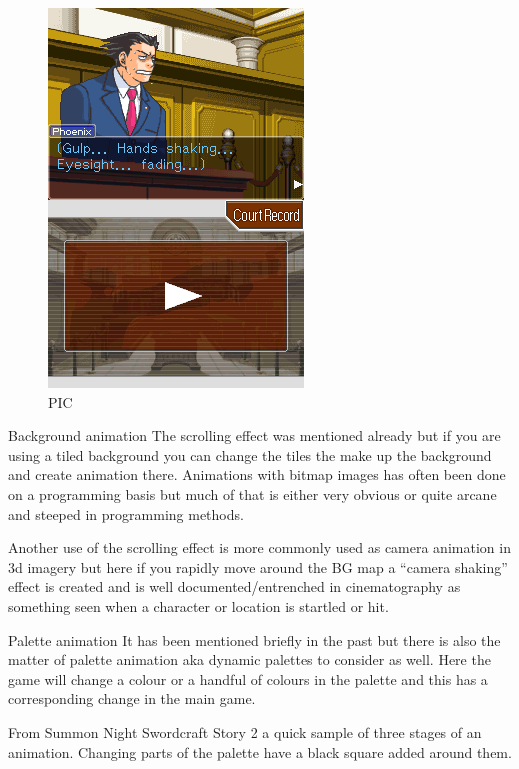 \documentclass[
]{book}
\begin{document}
\begin{figure}
\centering
\includegraphics{images/52_home_fast6191_romhackingguide_unrenamed_file___nal_borders_romhackingguideOAManimation_2_2.png}
\caption{PIC}
\end{figure}

Background animation The scrolling effect was mentioned already but if you are using a tiled background you can change the tiles the make up the background and create animation there. Animations with bitmap images has often been done on a programming basis but much of that is either very obvious or quite arcane and steeped in programming methods.

Another use of the scrolling effect is more commonly used as camera animation in 3d imagery but here if you rapidly move around the BG map a ``camera shaking'' effect is created and is well documented/entrenched in cinematography as something seen when a character or location is startled or hit.

Palette animation It has been mentioned briefly in the past but there is also the matter of palette animation aka dynamic palettes to consider as well. Here the game will change a colour or a handful of colours in the palette and this has a corresponding change in the main game.

From Summon Night Swordcraft Story 2 a quick sample of three stages of an animation. Changing parts of the palette have a black square added around them.
\end{document}
